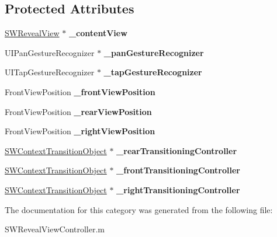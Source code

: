 \subsection*{Protected Attributes}
\begin{DoxyCompactItemize}
\item 
\mbox{\label{category_s_w_reveal_view_controller_07_08_a4d60f644306d2979ee1c557d3f980a01}} 
\hyperlink{interface_s_w_reveal_view}{S\+W\+Reveal\+View} $\ast$ {\bfseries \+\_\+content\+View}
\item 
\mbox{\label{category_s_w_reveal_view_controller_07_08_ae49b30b4c290fccab11e65e2954c88d1}} 
U\+I\+Pan\+Gesture\+Recognizer $\ast$ {\bfseries \+\_\+pan\+Gesture\+Recognizer}
\item 
\mbox{\label{category_s_w_reveal_view_controller_07_08_a4bf66e624f5411ad643a2d74a641c744}} 
U\+I\+Tap\+Gesture\+Recognizer $\ast$ {\bfseries \+\_\+tap\+Gesture\+Recognizer}
\item 
\mbox{\label{category_s_w_reveal_view_controller_07_08_a287735bf4a33513630d348574979e03b}} 
Front\+View\+Position {\bfseries \+\_\+front\+View\+Position}
\item 
\mbox{\label{category_s_w_reveal_view_controller_07_08_af0c344e04ad18c5cb93bb2987a6850f8}} 
Front\+View\+Position {\bfseries \+\_\+rear\+View\+Position}
\item 
\mbox{\label{category_s_w_reveal_view_controller_07_08_a0c42cc9c1a504f454762018bbdf7d40d}} 
Front\+View\+Position {\bfseries \+\_\+right\+View\+Position}
\item 
\mbox{\label{category_s_w_reveal_view_controller_07_08_a7a430d9121727198d1face97a0efe57a}} 
\hyperlink{interface_s_w_context_transition_object}{S\+W\+Context\+Transition\+Object} $\ast$ {\bfseries \+\_\+rear\+Transitioning\+Controller}
\item 
\mbox{\label{category_s_w_reveal_view_controller_07_08_a8c1134499689331f5d13e0caefec427a}} 
\hyperlink{interface_s_w_context_transition_object}{S\+W\+Context\+Transition\+Object} $\ast$ {\bfseries \+\_\+front\+Transitioning\+Controller}
\item 
\mbox{\label{category_s_w_reveal_view_controller_07_08_aa1c4b8816d94b5890161821f0755c8ff}} 
\hyperlink{interface_s_w_context_transition_object}{S\+W\+Context\+Transition\+Object} $\ast$ {\bfseries \+\_\+right\+Transitioning\+Controller}
\end{DoxyCompactItemize}


The documentation for this category was generated from the following file\+:\begin{DoxyCompactItemize}
\item 
S\+W\+Reveal\+View\+Controller.\+m\end{DoxyCompactItemize}
